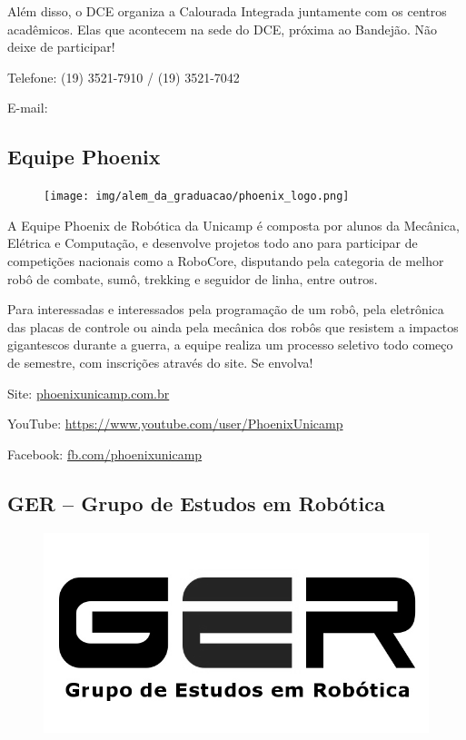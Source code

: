 Além disso, o DCE organiza a Calourada Integrada juntamente com os centros
acadêmicos. Elas que acontecem na sede do DCE, próxima ao Bandejão. Não deixe
de participar!

\begin{compactitemize}
\item Telefone: (19) 3521-7910 / (19) 3521-7042
\item E-mail: 
\end{compactitemize}

\subsection{Equipe Phoenix}

\begin{figure}[h!]
  \centering
  \texttt{[image: img/alem\_da\_graduacao/phoenix\_logo.png]}
\end{figure}

A Equipe Phoenix de Robótica da Unicamp é composta por alunos da Mecânica,
Elétrica e Computação, e desenvolve projetos todo ano para participar de
competições nacionais como a RoboCore, disputando pela categoria de melhor robô
de combate, sumô, trekking e seguidor de linha, entre outros.

Para interessadas e interessados pela programação de um robô,  pela eletrônica
das placas de controle ou ainda pela mecânica dos robôs que resistem a impactos
gigantescos durante a guerra, a equipe realiza um processo seletivo todo começo
de semestre, com inscrições através do site. Se envolva!

\begin{compactitemize}
\item Site: \url{phoenixunicamp.com.br}
\item YouTube: \url{https://www.youtube.com/user/PhoenixUnicamp}
\item Facebook: \url{fb.com/phoenixunicamp}
\end{compactitemize}

\subsection{GER -- Grupo de Estudos em Robótica}

\begin{figure}[h!]
    \centering
    \includegraphics[width=.35\textwidth]{img/alem_da_graduacao/ger_logo.jpg}
\end{figure}

